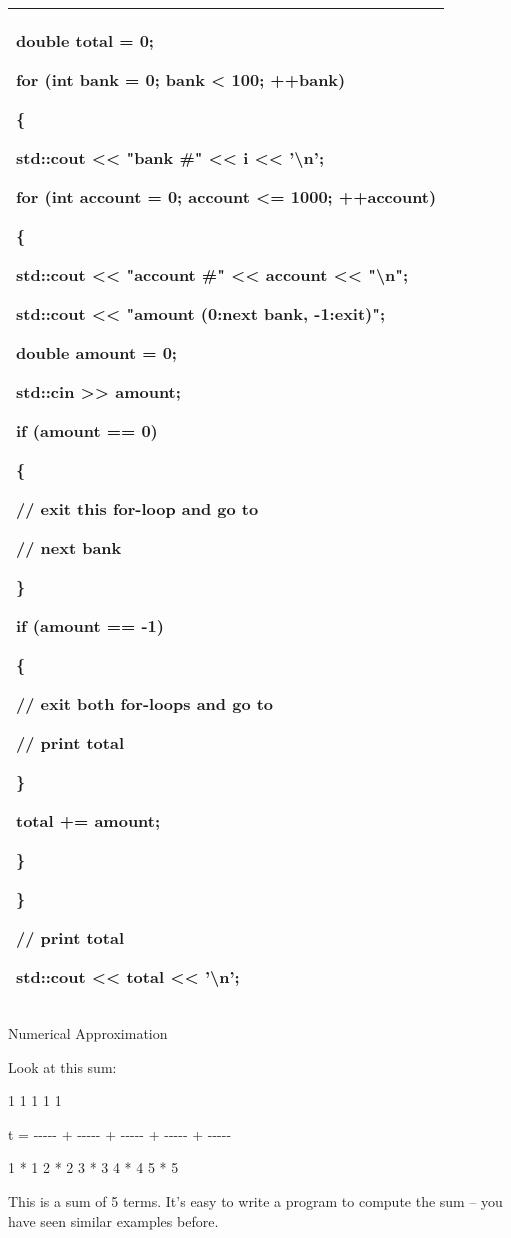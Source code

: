 \documentclass[
]{article}
\begin{document}
\begin{longtable}[]{@{}l@{}}
\toprule
\endhead
\begin{minipage}[t]{0.97\columnwidth}\raggedright
double total = 0;

for (int bank = 0; bank \textless{} 100; ++bank)

\{

std::cout \textless\textless{} "bank \#" \textless\textless{} i
\textless\textless{} '\textbackslash n';

for (int account = 0; account \textless= 1000; ++account)

\{

std::cout \textless\textless{} "account \#" \textless\textless{} account
\textless\textless{} "\textbackslash n";

std::cout \textless\textless{} "amount (0:next bank, -1:exit)";

double amount = 0;

std::cin \textgreater\textgreater{} amount;

if (amount == 0)

\{

// exit this for-loop and go to

// next bank

\}

if (amount == -1)

\{

// exit both for-loops and go to

// print total

\}

total += amount;

\}

\}

// print total

std::cout \textless\textless{} total \textless\textless{}
'\textbackslash n';\strut
\end{minipage}\tabularnewline
\bottomrule
\end{longtable}

Numerical Approximation

Look at this sum:

1 1 1 1 1

t = -\/-\/-\/-\/- + -\/-\/-\/-\/- + -\/-\/-\/-\/- + -\/-\/-\/-\/- +
-\/-\/-\/-\/-

1 * 1 2 * 2 3 * 3 4 * 4 5 * 5

This is a sum of 5 terms. It's easy to write a program to compute the
sum -- you have seen similar examples before.
\end{document}
